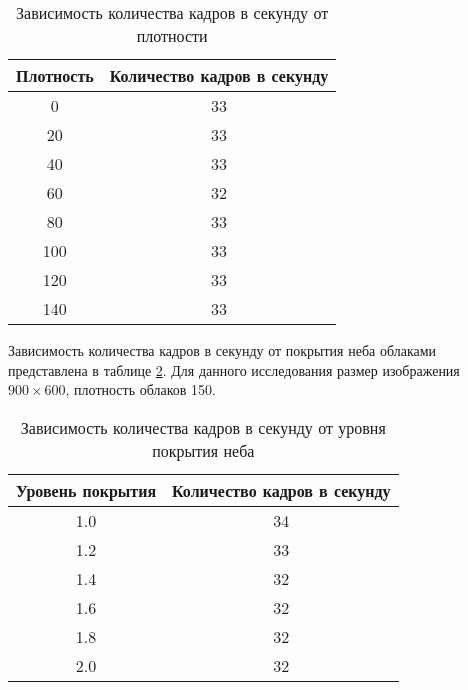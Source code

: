 \begin{table}[H]
	\begin{center}
		\begin{threeparttable}
			\captionsetup{justification=raggedright,singlelinecheck=off}
			\caption{Зависимость количества кадров в секунду от плотности}
			\label{tbl:densfps}
			\begin{tabular}{|c|c|}
				\hline
				Плотность &  Количество кадров в секунду \\
				\hline
					0 & 33 \\
					\hline
					20 & 33 \\
					\hline
					40 & 33 \\
					\hline
					60 & 32 \\
					\hline
					80 & 33 \\
					\hline
					100 & 33 \\
					\hline
					120 & 33 \\
					\hline
					140 & 33 \\
				\hline
			\end{tabular}
		\end{threeparttable}
	\end{center}
\end{table}


Зависимость количества кадров в секунду от покрытия неба облаками представлена в таблице \ref{tbl:covfps}. Для данного исследования размер изображения $900 \times 600$, плотность облаков 150.

\begin{table}[H]
	\begin{center}
		\begin{threeparttable}
			\captionsetup{justification=raggedright,singlelinecheck=off}
			\caption{Зависимость количества кадров в секунду от уровня покрытия неба}
			\label{tbl:covfps}
			\begin{tabular}{|c|c|}
				\hline
				Уровень покрытия &  Количество кадров в секунду \\
					\hline
				1.0 & 34 \\
				\hline
				1.2 & 33 \\
				\hline
				1.4 & 32 \\
				\hline
				1.6 & 32 \\
				\hline
				1.8 & 32 \\
				\hline
				2.0 & 32 \\
				\hline
			\end{tabular}
		\end{threeparttable}
	\end{center}
\end{table}


